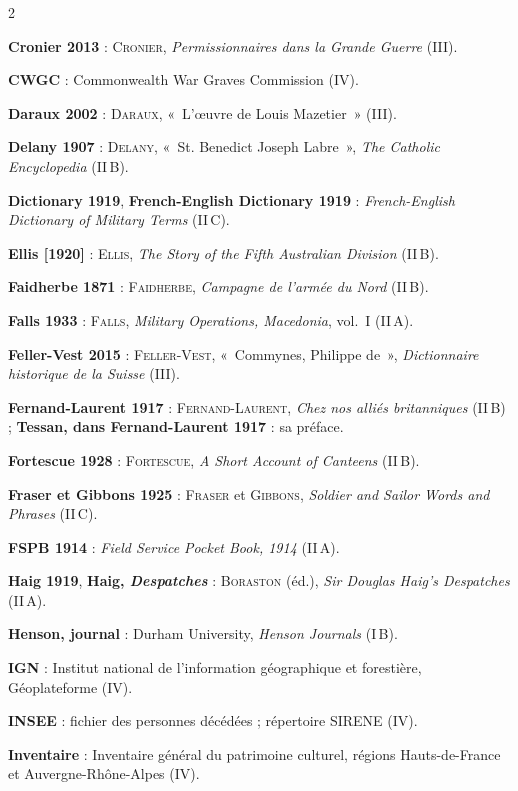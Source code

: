 \begin{multicols}{2}
\begin{biblist}
\item \textbf{Cronier 2013} : \textsc{Cronier}, \textit{Permissionnaires dans la Grande Guerre} (III).
\item \textbf{CWGC} : Commonwealth War Graves Commission (IV).
\item \textbf{Daraux 2002} : \textsc{Daraux}, «~L'œuvre de Louis Mazetier~» (III).
\item \textbf{Delany 1907} : \textsc{Delany}, «~St. Benedict Joseph Labre~», \textit{The Catholic Encyclopedia} (II\,B).
\item \textbf{Dictionary 1919}, \textbf{French-English Dictionary 1919} : \textit{French-English Dictionary of Military Terms} (II\,C).
\item \textbf{Ellis [1920]} : \textsc{Ellis}, \textit{The Story of the Fifth Australian Division} (II\,B).
\item \textbf{Faidherbe 1871} : \textsc{Faidherbe}, \textit{Campagne de l'armée du Nord} (II\,B).
\item \textbf{Falls 1933} : \textsc{Falls}, \textit{Military Operations, Macedonia}, vol.~I (II\,A).
\item \textbf{Feller-Vest 2015} : \textsc{Feller-Vest}, «~Commynes, Philippe de~», \textit{Dictionnaire historique de la Suisse} (III).
\item \textbf{Fernand-Laurent 1917} : \textsc{Fernand-Laurent}, \textit{Chez nos alliés britanniques} (II\,B) ; \textbf{Tessan, dans Fernand-Laurent 1917} : sa préface.
\item \textbf{Fortescue 1928} : \textsc{Fortescue}, \textit{A Short Account of Canteens} (II\,B).
\item \textbf{Fraser et Gibbons 1925} : \textsc{Fraser} et \textsc{Gibbons}, \textit{Soldier and Sailor Words and Phrases} (II\,C).
\item \textbf{FSPB 1914} : \textit{Field Service Pocket Book, 1914} (II\,A).
\item \textbf{Haig 1919}, \textbf{Haig, \textit{Despatches}} : \textsc{Boraston} (éd.), \textit{Sir Douglas Haig's Despatches} (II\,A).
\item \textbf{Henson, journal} : Durham University, \textit{Henson Journals} (I\,B).
\item \textbf{IGN} : Institut national de l'information géographique et forestière, Géoplateforme (IV).
\item \textbf{INSEE} : fichier des personnes décédées ; répertoire SIRENE (IV).
\item \textbf{Inventaire} : Inventaire général du patrimoine culturel, régions Hauts-de-France et Auvergne-Rhône-Alpes (IV).

\end{biblist}
\end{multicols}
